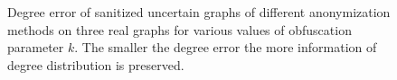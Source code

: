 
\begin{figure}[!htb]
    \centering
    \vspace{-5pt}
    \caption{Degree error of sanitized uncertain graphs of different anonymization methods on three real graphs for various values of obfuscation parameter $k$. The smaller the degree error the more information of degree distribution is preserved.}
    \vspace{-5pt}
    \label{fig:dd}
\end{figure} 


